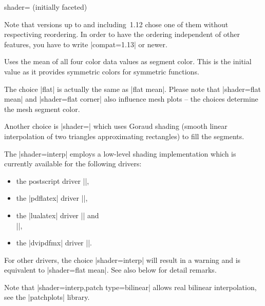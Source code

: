 {\begin{pgfplotskey}{shader= (initially faceted)%
}
\begin{description}
            Note that \PGFPlots{} versions up to and including~1.12 chose one
            of them without respectiving reordering. In order to have the
            ordering independent of other features, you have to write
            |compat=1.13| or newer.
        \item[\declaretext{flat mean}] Uses the mean of all four color data
            values as segment color. This is the initial value as it provides
            symmetric colors for symmetric functions.
    \end{description}
    The choice |flat| is actually the same as |flat mean|. Please note that
    |shader=flat mean| and |shader=flat corner| also influence mesh plots --
    the choices determine the mesh segment color.

    Another choice is |shader=| which uses Goraud
    shading (smooth linear interpolation of two triangles approximating
    rectangles) to fill the segments.

\pgfplotsexpensiveexample
\begin{codeexample}[]
\end{codeexample}

    The |shader=interp| employs a low-level shading implementation which is
    currently available for the following drivers:
    \begin{itemize}
        \item the postscript driver |\def\pgfsysdriver{pgfsys-dvips.def}|,
        \item the |pdflatex| driver |\def\pgfsysdriver{pgfsys-pdftex.def}|,
        \item the |lualatex| driver |\def\pgfsysdriver{pgfsys-pdftex.def}| and \\
            |\def\pgfsysdriver{pgfsys-luatex.def}|,
        \item the |dvipdfmx| driver |\def\pgfsysdriver{pgfsys-dvipdfmx.def}|.
    \end{itemize}
    For other drivers, the choice |shader=interp| will result in a warning and
    is equivalent to |shader=flat mean|. See also below for detail remarks.

    Note that |shader=interp,patch type=bilinear| allows real bilinear
    interpolation, see the |patchplots| library.


\end{pgfplotskey}}
